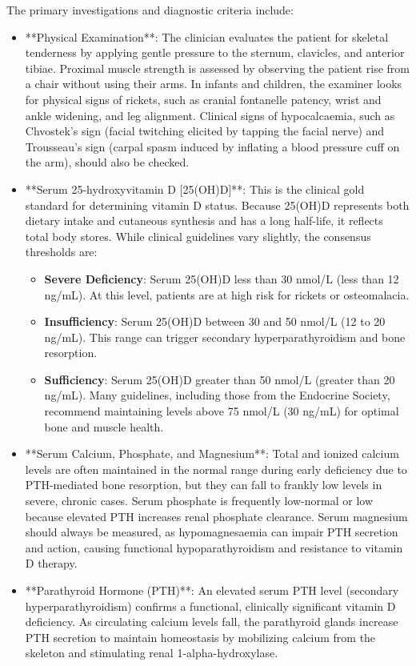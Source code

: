 The primary investigations and diagnostic criteria include:
\begin{itemize}
    \item **Physical Examination**: The clinician evaluates the patient for skeletal tenderness by applying gentle pressure to the sternum, clavicles, and anterior tibiae. Proximal muscle strength is assessed by observing the patient rise from a chair without using their arms. In infants and children, the examiner looks for physical signs of rickets, such as cranial fontanelle patency, wrist and ankle widening, and leg alignment. Clinical signs of hypocalcaemia, such as Chvostek's sign (facial twitching elicited by tapping the facial nerve) and Trousseau's sign (carpal spasm induced by inflating a blood pressure cuff on the arm), should also be checked.
    \item **Serum 25-hydroxyvitamin D [25(OH)D]**: This is the clinical gold standard for determining vitamin D status. Because 25(OH)D represents both dietary intake and cutaneous synthesis and has a long half-life, it reflects total body stores. While clinical guidelines vary slightly, the consensus thresholds are:
        \begin{itemize}
            \item \textbf{Severe Deficiency}: Serum 25(OH)D less than 30 nmol/L (less than 12 ng/mL). At this level, patients are at high risk for rickets or osteomalacia.
            \item \textbf{Insufficiency}: Serum 25(OH)D between 30 and 50 nmol/L (12 to 20 ng/mL). This range can trigger secondary hyperparathyroidism and bone resorption.
            \item \textbf{Sufficiency}: Serum 25(OH)D greater than 50 nmol/L (greater than 20 ng/mL). Many guidelines, including those from the Endocrine Society, recommend maintaining levels above 75 nmol/L (30 ng/mL) for optimal bone and muscle health.
        \end{itemize}
    \item **Serum Calcium, Phosphate, and Magnesium**: Total and ionized calcium levels are often maintained in the normal range during early deficiency due to PTH-mediated bone resorption, but they can fall to frankly low levels in severe, chronic cases. Serum phosphate is frequently low-normal or low because elevated PTH increases renal phosphate clearance. Serum magnesium should always be measured, as hypomagnesaemia can impair PTH secretion and action, causing functional hypoparathyroidism and resistance to vitamin D therapy.
    \item **Parathyroid Hormone (PTH)**: An elevated serum PTH level (secondary hyperparathyroidism) confirms a functional, clinically significant vitamin D deficiency. As circulating calcium levels fall, the parathyroid glands increase PTH secretion to maintain homeostasis by mobilizing calcium from the skeleton and stimulating renal 1-alpha-hydroxylase.

\end{itemize}
